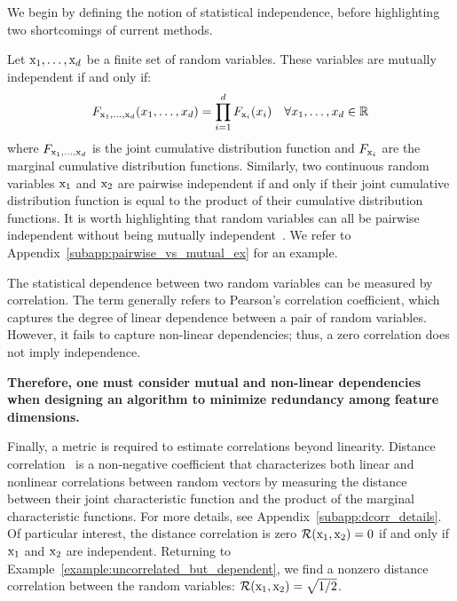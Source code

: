 We begin by defining the notion of statistical independence, before highlighting two shortcomings of current methods. %

Let ${{\textnormal{x}}_1, \ldots, {\textnormal{x}}_d}$ be a finite set of random variables. These variables are mutually independent if and only if: 
\begin{equation}
F_{{\textnormal{x}}_1, \dots, {\textnormal{x}}_d}(x_1, \dots, x_d) = \prod_{i=1}^d F_{{\textnormal{x}}_i}(x_i) \quad \forall x_1, \dots, x_d \in \mathbb{R}
\end{equation}
where $F_{{\textnormal{x}}_1, \dots, {\textnormal{x}}_d}$ is the joint cumulative distribution function and $F_{{\textnormal{x}}_i}$ are the marginal cumulative distribution functions. 
Similarly, two continuous random variables ${\textnormal{x}}_1$ and ${\textnormal{x}}_2$ are pairwise independent if and only if their joint cumulative distribution function is equal to the product of their cumulative distribution functions. 
It is worth highlighting that random variables can all be pairwise independent without being mutually independent~\citep{driscoll1978pairwise_mutual_indep_example}. We refer to Appendix~\ref{subapp:pairwise_vs_mutual_ex} for an example. 

The statistical dependence between two random variables can be measured by correlation. The term generally refers to Pearson's correlation coefficient, which captures the degree of linear dependence between a pair of random variables. 
However, it fails to capture non-linear dependencies; thus, a zero correlation does not imply independence. 

\textbf{Therefore, one must consider mutual and non-linear dependencies when designing an algorithm to minimize redundancy among feature dimensions. }

Finally, a metric is required to estimate correlations beyond linearity. 
Distance correlation~\citep{szekely2007_dcorr} is a non-negative coefficient that characterizes both linear and nonlinear correlations between random vectors by measuring the distance between their joint characteristic function and the product of the marginal characteristic functions. For more details, see Appendix~\ref{subapp:dcorr_details}. 
Of particular interest, the distance correlation is zero $\mathcal{R}({\textnormal{x}}_1, {\textnormal{x}}_2) = 0$ if and only if ${\textnormal{x}}_1$ and ${\textnormal{x}}_2$ are independent. Returning to Example~\ref{example:uncorrelated_but_dependent}, we find a nonzero distance correlation between the random variables: $\mathcal{R}({\textnormal{x}}_1, {\textnormal{x}}_2) = \sqrt{1/2}$. 
